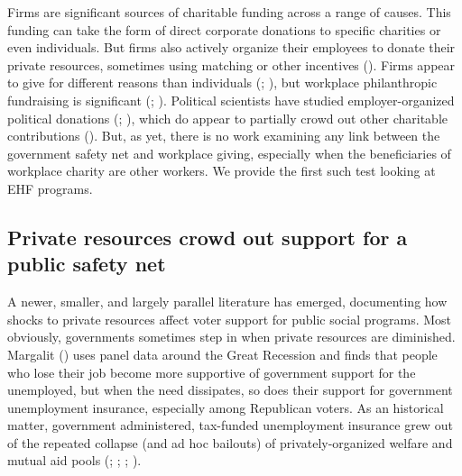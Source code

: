 \documentclass[
  11pt,
  oneside]{article}
\begin{document}
Firms are significant sources of charitable funding across a range of causes. This funding can take the form of direct corporate donations to specific charities or even individuals. But firms also actively organize their employees to donate their private resources, sometimes using matching or other incentives (). Firms appear to give for different reasons than individuals (; ), but workplace philanthropic fundraising is significant (; ). Political scientists have studied employer-organized political donations (; ), which do appear to partially crowd out other charitable contributions (). But, as yet, there is no work examining any link between the government safety net and workplace giving, especially when the beneficiaries of workplace charity are other workers. We provide the first such test looking at EHF programs.

\subsection{Private resources crowd out support for a public safety net}\label{private-resources-crowd-out-support-for-a-public-safety-net}

A newer, smaller, and largely parallel literature has emerged, documenting how shocks to private resources affect voter support for public social programs. Most obviously, governments sometimes step in when private resources are diminished. Margalit () uses panel data around the Great Recession and finds that people who lose their job become more supportive of government support for the unemployed, but when the need dissipates, so does their support for government unemployment insurance, especially among Republican voters. As an historical matter, government administered, tax-funded unemployment insurance grew out of the repeated collapse (and ad hoc bailouts) of privately-organized welfare and mutual aid pools (; ; ; ).
\end{document}
